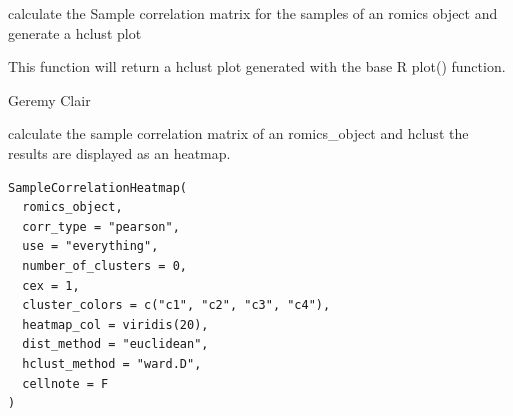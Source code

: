 \documentclass[a4paper]{book}
\begin{document}
%
\begin{Details}
calculate the Sample correlation matrix for the samples of an romics object and generate a hclust plot
\end{Details}
%
\begin{Value}
This function will return a hclust plot generated with the base R plot() function.
\end{Value}
%
\begin{Author}
Geremy Clair
\end{Author}
%
\begin{Description}
calculate the sample correlation matrix of an romics\_object and hclust the results are displayed as an heatmap.
\end{Description}
%
\begin{Usage}
\begin{verbatim}
SampleCorrelationHeatmap(
  romics_object,
  corr_type = "pearson",
  use = "everything",
  number_of_clusters = 0,
  cex = 1,
  cluster_colors = c("c1", "c2", "c3", "c4"),
  heatmap_col = viridis(20),
  dist_method = "euclidean",
  hclust_method = "ward.D",
  cellnote = F
)
\end{verbatim}
\end{Usage}
%
\end{document}
